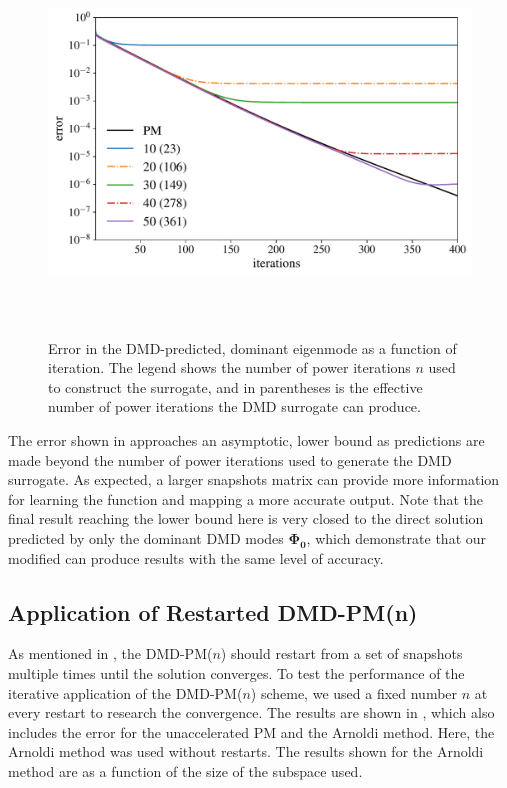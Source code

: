\begin{figure}[htb]%
    \centering
    \includegraphics[height=4.0in]{tex/figures/skipahead.pdf}
   \caption{Error in the DMD-predicted, dominant eigenmode as a function of iteration.  The legend shows the number of power iterations $n$ used to construct the surrogate, and in parentheses is the effective number of power iterations the DMD surrogate can produce.}
  \label{fig:skipahead}
\end{figure}

The error shown in  approaches an asymptotic, lower bound as predictions are made beyond the number of power iterations used to generate the DMD surrogate.
As expected, a larger snapshots matrix can provide more information for learning the function and mapping a more accurate output.
Note that the final result reaching the lower bound here is very closed to the direct solution predicted by only the dominant DMD modes $\mathbf{\Phi_0}$, which demonstrate that our modified  can produce results with the same level of accuracy.

\subsection{Application of Restarted DMD-PM(n)}
As mentioned in , the DMD-PM($n$) should restart from a set of snapshots multiple times until the solution converges.
To test the performance of the iterative application of the DMD-PM($n$) scheme, we used a fixed number $n$ at every restart to research the convergence.  
The results are shown in , which also includes the error for the unaccelerated PM and the Arnoldi method.
Here, the Arnoldi method was used without restarts. 
The results shown for the Arnoldi method are as a function of the size of the subspace used.

